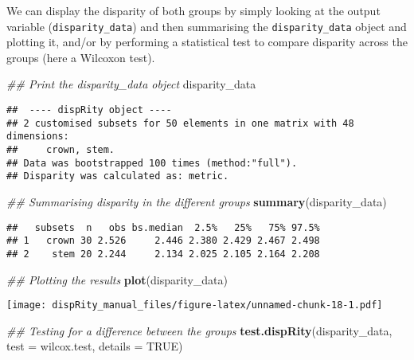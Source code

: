 \documentclass[
]{book}
\newenvironment{Shaded}{\begin{snugshade}}{\end{snugshade}}
\newcommand{\CommentTok}[1]{\textcolor[rgb]{0.56,0.35,0.01}{\textit{#1}}}
\newcommand{\DataTypeTok}[1]{\textcolor[rgb]{0.13,0.29,0.53}{#1}}
\newcommand{\KeywordTok}[1]{\textcolor[rgb]{0.13,0.29,0.53}{\textbf{#1}}}
\newcommand{\NormalTok}[1]{#1}
\newcommand{\OtherTok}[1]{\textcolor[rgb]{0.56,0.35,0.01}{#1}}
\begin{document}
We can display the disparity of both groups by simply looking at the output variable (\texttt{disparity\_data}) and then summarising the \texttt{disparity\_data} object and plotting it, and/or by performing a statistical test to compare disparity across the groups (here a Wilcoxon test).

\begin{Shaded}
\begin{Highlighting}[]
\CommentTok{\#\# Print the disparity\_data object}
\NormalTok{disparity\_data}
\end{Highlighting}
\end{Shaded}

\begin{verbatim}
##  ---- dispRity object ---- 
## 2 customised subsets for 50 elements in one matrix with 48 dimensions:
##     crown, stem.
## Data was bootstrapped 100 times (method:"full").
## Disparity was calculated as: metric.
\end{verbatim}

\begin{Shaded}
\begin{Highlighting}[]
\CommentTok{\#\# Summarising disparity in the different groups}
\KeywordTok{summary}\NormalTok{(disparity\_data)}
\end{Highlighting}
\end{Shaded}

\begin{verbatim}
##   subsets  n   obs bs.median  2.5%   25%   75% 97.5%
## 1   crown 30 2.526     2.446 2.380 2.429 2.467 2.498
## 2    stem 20 2.244     2.134 2.025 2.105 2.164 2.208
\end{verbatim}

\begin{Shaded}
\begin{Highlighting}[]
\CommentTok{\#\# Plotting the results}
\KeywordTok{plot}\NormalTok{(disparity\_data)}
\end{Highlighting}
\end{Shaded}

\texttt{[image: dispRity\_manual\_files/figure-latex/unnamed-chunk-18-1.pdf]}

\begin{Shaded}
\begin{Highlighting}[]
\CommentTok{\#\# Testing for a difference between the groups}
\KeywordTok{test.dispRity}\NormalTok{(disparity\_data, }\DataTypeTok{test =}\NormalTok{ wilcox.test, }\DataTypeTok{details =} \OtherTok{TRUE}\NormalTok{)}
\end{Highlighting}
\end{Shaded}
\end{document}
